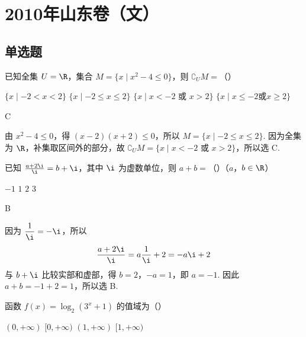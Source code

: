 \chapter{2010年山东卷（文）}

\section{单选题}

\begin{problem}
已知全集 \(U = \R\)，集合 \(M = \{x \mid x^2 - 4 \leqslant 0\}\)，则 \(\complement_U M =\)（\quad）

\choices
    {\(\{x\mid -2 < x < 2\}\)}
    {\(\{x\mid -2\leqslant x\leqslant 2\}\)}
    {\(\{x \mid x < -2 \text{\ 或\ } x > 2\}\)}
    {\(\{x\mid x\leqslant -2\text{或} x\geqslant 2\}\)}
\end{problem}

\begin{answer}
C
\end{answer}

\begin{solution}
由 \(x^2-4\leqslant0\)，得 \((x-2)(x+2)\leqslant0\)，所以
\(M=\{x\mid -2\leqslant x\leqslant2\}\). 因为全集为 \(\R\)，补集取区间外的部分，故
\(\complement_U M=\{x\mid x<-2\text{ 或 }x>2\}\)，所以选 C.
\end{solution}

\begin{problem}
已知 \(\frac{a + 2\i}{\i} = b + \i\)，其中 \(\i\) 为虚数单位，则 \(a + b =\)（\quad）（\(a\)，\(b \in \R\)）

\choices
    {\(-1\)}
    {\(1\)}
    {\(2\)}
    {\(3\)}
\end{problem}

\begin{answer}
B
\end{answer}

\begin{solution}
因为 \(\dfrac{1}{\i}=-\i\)，所以
\[
\frac{a+2\i}{\i}=a\frac{1}{\i}+2=-a\i+2
\]
与 \(b+\i\) 比较实部和虚部，得 \(b=2\)，\(-a=1\)，即 \(a=-1\). 因此
\(a+b=-1+2=1\)，所以选 B.
\end{solution}

\begin{problem}
函数 \(f(x) = \log_2(3^x + 1)\) 的值域为（\quad）

\choices
    {\((0, +\infty)\)}
    {\([0, +\infty)\)}
    {\((1, +\infty)\)}
    {\([1, +\infty)\)}
\end{problem}

